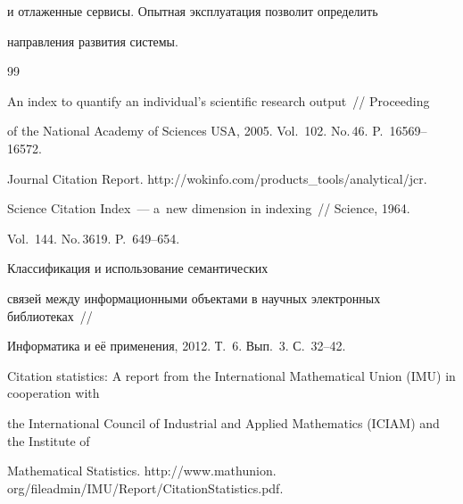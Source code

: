 и отлаженные сервисы. Опытная эксплуатация позволит определить


направления развития системы.





\vspace*{-3pt}





{\small\frenchspacing


{%




\begin{thebibliography}{99}





\vspace*{-1pt}




 An index to quantify an individual's scientific research output~/\!\!/ Proceeding


of the National Academy of Sciences USA, 2005. Vol.~102. No.\,46. P.~16569--16572.




Journal Citation Report. {\sf http://wokinfo.com/products\_tools/analytical/jcr}.




 Science Citation Index~--- a~new dimension in indexing~/\!\!/ Science, 1964.


Vol.~144. No.\,3619. P.~649--654.







 Классификация и использование семантических


связей между информационными объектами в научных электронных библиотеках~/\!\!/


Информатика и её применения, 2012. Т.~6. Вып.~3. С.~32--42.




Citation statistics: A report from the International Mathematical Union (IMU) in cooperation with


the International Council of Industrial and Applied Mathematics (ICIAM) and the Institute of


Mathematical Statistics. {\sf http://www.mathunion. org/fileadmin/IMU/Report/CitationStatistics.pdf}.






\end{thebibliography}}}
